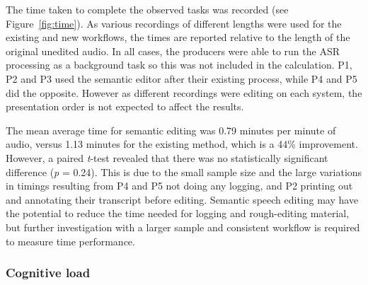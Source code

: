 The time taken to complete the observed tasks was recorded (see Figure~\ref{fig:time}). As various recordings of
different lengths were used for the existing and new workflows, the times are reported relative to the length of the
original unedited audio. In all cases, the producers were able to run the ASR processing as a background
task so this was not included in the calculation. P1, P2 and P3 used the semantic editor after their existing process,
while P4 and P5 did the opposite. However as different recordings were editing on each system, the presentation order
is not expected to affect the results.

The mean average time for semantic editing was 0.79 minutes per minute of audio, versus 1.13 minutes for the existing
method, which is a 44\% improvement. However, a paired \textit{t}-test revealed that there was no statistically
significant difference (\textit{p} = 0.24).  This is due to the small sample size and the large variations in timings
resulting from P4 and P5 not doing any logging, and P2 printing out and annotating their transcript before editing.
Semantic speech editing may have the potential to reduce the time needed for logging and rough-editing material, but
further investigation with a larger sample and consistent workflow is required to measure time performance.




\subsubsection{Cognitive load}


